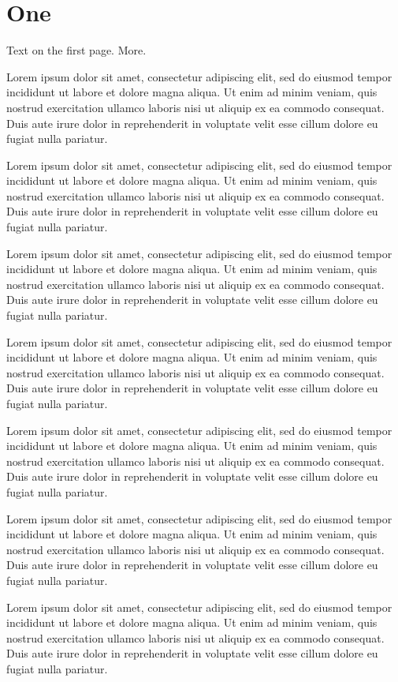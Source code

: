 \documentclass{article}
\begin{document}
\section{One}\label{s1}
Text on the first page.\label{p1} More.\label{p1b}

Lorem ipsum dolor sit amet, consectetur adipiscing elit, sed do eiusmod tempor incididunt ut labore et dolore magna aliqua. Ut enim ad minim veniam, quis nostrud exercitation ullamco laboris nisi ut aliquip ex ea commodo consequat. Duis aute irure dolor in reprehenderit in voluptate velit esse cillum dolore eu fugiat nulla pariatur.

Lorem ipsum dolor sit amet, consectetur adipiscing elit, sed do eiusmod tempor incididunt ut labore et dolore magna aliqua. Ut enim ad minim veniam, quis nostrud exercitation ullamco laboris nisi ut aliquip ex ea commodo consequat. Duis aute irure dolor in reprehenderit in voluptate velit esse cillum dolore eu fugiat nulla pariatur.

Lorem ipsum dolor sit amet, consectetur adipiscing elit, sed do eiusmod tempor incididunt ut labore et dolore magna aliqua. Ut enim ad minim veniam, quis nostrud exercitation ullamco laboris nisi ut aliquip ex ea commodo consequat. Duis aute irure dolor in reprehenderit in voluptate velit esse cillum dolore eu fugiat nulla pariatur.

Lorem ipsum dolor sit amet, consectetur adipiscing elit, sed do eiusmod tempor incididunt ut labore et dolore magna aliqua. Ut enim ad minim veniam, quis nostrud exercitation ullamco laboris nisi ut aliquip ex ea commodo consequat. Duis aute irure dolor in reprehenderit in voluptate velit esse cillum dolore eu fugiat nulla pariatur.

Lorem ipsum dolor sit amet, consectetur adipiscing elit, sed do eiusmod tempor incididunt ut labore et dolore magna aliqua. Ut enim ad minim veniam, quis nostrud exercitation ullamco laboris nisi ut aliquip ex ea commodo consequat. Duis aute irure dolor in reprehenderit in voluptate velit esse cillum dolore eu fugiat nulla pariatur.

Lorem ipsum dolor sit amet, consectetur adipiscing elit, sed do eiusmod tempor incididunt ut labore et dolore magna aliqua. Ut enim ad minim veniam, quis nostrud exercitation ullamco laboris nisi ut aliquip ex ea commodo consequat. Duis aute irure dolor in reprehenderit in voluptate velit esse cillum dolore eu fugiat nulla pariatur.

Lorem ipsum dolor sit amet, consectetur adipiscing elit, sed do eiusmod tempor incididunt ut labore et dolore magna aliqua. Ut enim ad minim veniam, quis nostrud exercitation ullamco laboris nisi ut aliquip ex ea commodo consequat. Duis aute irure dolor in reprehenderit in voluptate velit esse cillum dolore eu fugiat nulla pariatur.
\end{document}
